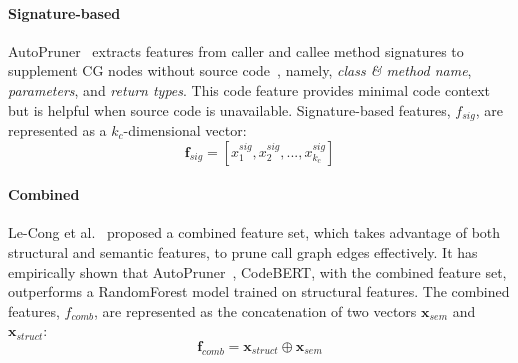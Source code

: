 \paragraph{Signature-based}
AutoPruner~\cite{le2022autopruner} extracts features from caller and callee method signatures to supplement CG nodes without source code~\cite{apimp}, namely, \emph{class \& method name}, \emph{parameters}, and \emph{return types}.
This code feature provides minimal code context but is helpful when source code is unavailable.
Signature-based features, $f_{sig}$, are represented as a $k_{c}$-dimensional vector:
\begin{equation}
\mathbf{f}_{sig} = [x_{1}^{sig}, x_{2}^{sig}, ..., x_{k_{c}}^{sig}]
\end{equation}

\paragraph{Combined}
Le-Cong et al.~\cite{le2022autopruner} proposed a combined feature set, which takes advantage of both structural and semantic features, to prune call graph edges effectively. It has empirically shown that AutoPruner~\cite{le2022autopruner}, CodeBERT, with the combined feature set, outperforms a RandomForest model trained on structural features. The combined features, $f_{comb}$, are represented as the concatenation of two vectors $\mathbf{x}_{sem}$ and $\mathbf{x}_{struct}$:
\begin{equation}
\mathbf{f}_{comb} = \mathbf{x}_{struct} \oplus \mathbf{x}_{sem}
\end{equation}

